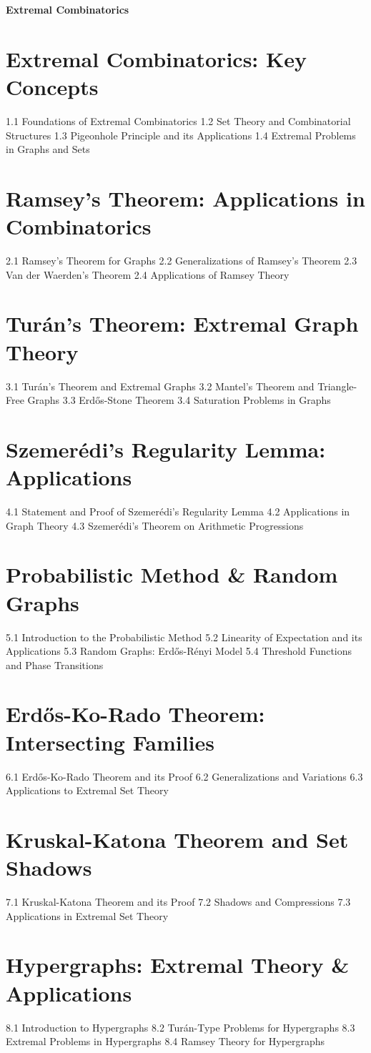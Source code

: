 {\LARGE \bf{Extremal Combinatorics}}
\section{Extremal Combinatorics: Key Concepts}
1.1 Foundations of Extremal Combinatorics
1.2 Set Theory and Combinatorial Structures
1.3 Pigeonhole Principle and its Applications
1.4 Extremal Problems in Graphs and Sets
\section{Ramsey's Theorem: Applications in Combinatorics}
2.1 Ramsey's Theorem for Graphs
2.2 Generalizations of Ramsey's Theorem
2.3 Van der Waerden's Theorem
2.4 Applications of Ramsey Theory
\section{Turán's Theorem: Extremal Graph Theory}
3.1 Turán's Theorem and Extremal Graphs
3.2 Mantel's Theorem and Triangle-Free Graphs
3.3 Erdős-Stone Theorem
3.4 Saturation Problems in Graphs
\section{Szemerédi's Regularity Lemma: Applications}
4.1 Statement and Proof of Szemerédi's Regularity Lemma
4.2 Applications in Graph Theory
4.3 Szemerédi's Theorem on Arithmetic Progressions
\section{Probabilistic Method \& Random Graphs}
5.1 Introduction to the Probabilistic Method
5.2 Linearity of Expectation and its Applications
5.3 Random Graphs: Erdős-Rényi Model
5.4 Threshold Functions and Phase Transitions
\section{Erdős-Ko-Rado Theorem: Intersecting Families}
6.1 Erdős-Ko-Rado Theorem and its Proof
6.2 Generalizations and Variations
6.3 Applications to Extremal Set Theory
\section{Kruskal-Katona Theorem and Set Shadows}
7.1 Kruskal-Katona Theorem and its Proof
7.2 Shadows and Compressions
7.3 Applications in Extremal Set Theory
\section{Hypergraphs: Extremal Theory \& Applications}
8.1 Introduction to Hypergraphs
8.2 Turán-Type Problems for Hypergraphs
8.3 Extremal Problems in Hypergraphs
8.4 Ramsey Theory for Hypergraphs
